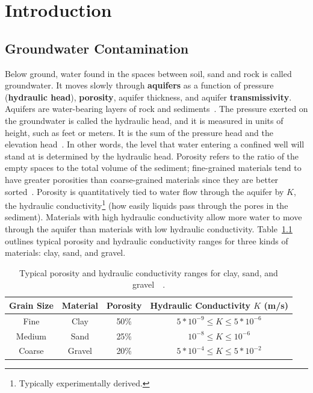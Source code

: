  \chapter{Introduction}
 \label{introchap}
\section{Groundwater Contamination}
Below ground, water found in the spaces between soil, sand and rock
is called groundwater. It moves slowly through
\textbf{aquifers} as a function of pressure (\textbf{hydraulic head}), \textbf{porosity},
aquifer thickness, and aquifer \textbf{transmissivity}. Aquifers are
water-bearing layers of rock and sediments~\cite{basics}. The pressure exerted on the groundwater is called
the hydraulic head, and it is measured in units of height, such as
feet or meters. It is the sum of the pressure head and the elevation head~\cite{basics}. In other words,
the level that water entering a confined well will stand at is
determined by the hydraulic head. Porosity refers to the ratio of the empty
spaces to the total volume of the sediment; fine-grained materials tend to
have greater porosities than coarse-grained materials since they are
better sorted~\cite{basics}. Porosity is quantitatively tied to water flow through
the aquifer by $K$, the hydraulic conductivity\footnote{Typically
  experimentally derived.} (how easily liquids pass through the pores in the sediment). Materials with high hydraulic conductivity allow more water
 to move through the aquifer than materials with low hydraulic
 conductivity. Table~\ref{tbl:porosity} outlines typical
porosity and hydraulic conductivity ranges for three kinds of materials: clay, sand, and
 gravel.
\begin {table}[H]
\caption [Typical porosity and hydraulic conductivity ranges for clay, sand, and gravel]{Typical
  porosity and hydraulic conductivity ranges for clay, sand, and gravel~\cite{basics}~\cite{geotechdata}.} \label{tbl:porosity}
\begin{center}
    \begin{tabular}{ | c | c | c |c|}
    \hline
    Grain Size & Material & Porosity & Hydraulic Conductivity $K$ (m/s)\\ \hline
    Fine & Clay  &  50\% &$5*10^{-9} \leq K \leq 5*10^{-6}$\\ \hline
    Medium &  Sand & 25\% & $10^{-8} \leq K \leq 10^{-6}$\\ \hline
    Coarse &  Gravel &  20\% & $5*10^{-4} \leq K \leq 5*10^{-2}$\\ \hline
    \end{tabular}
\end{center}
\end{table}
